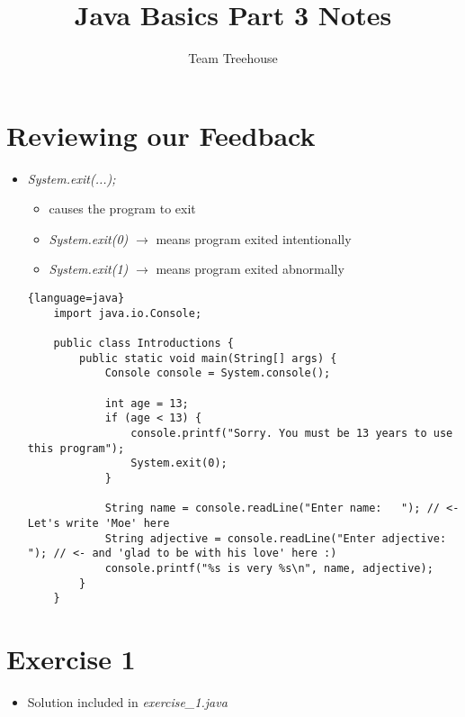 \documentclass[12pt]{article}
\begin{document}
\title{Java Basics Part 3 Notes}
\author{Team Treehouse}
\maketitle

\section{Reviewing our Feedback}

\bigskip

\begin{itemize}
    \item  \textit{System.exit(...);}
    \begin{itemize}
        \item causes the program to exit
        \item \textit{System.exit(0)} $\to$ means program exited intentionally
        \item \textit{System.exit(1)} $\to$ means program exited abnormally
    \end{itemize}

    \bigskip

    \begin{lstlisting}{language=java}
    import java.io.Console;

    public class Introductions {
        public static void main(String[] args) {
            Console console = System.console();

            int age = 13;
            if (age < 13) {
                console.printf("Sorry. You must be 13 years to use this program");
                System.exit(0);
            }

            String name = console.readLine("Enter name:   "); // <- Let's write 'Moe' here
            String adjective = console.readLine("Enter adjective:   "); // <- and 'glad to be with his love' here :)
            console.printf("%s is very %s\n", name, adjective);
        }
    }
    \end{lstlisting}

\end{itemize}


\section{Exercise 1}

\bigskip

\begin{itemize}
    \item Solution included in \textit{exercise\_1.java}
\end{itemize}
\end{document}
